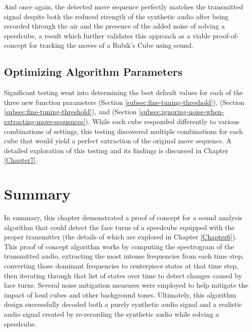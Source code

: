 And once again, the detected move sequence perfectly matches the transmitted signal despite both the reduced strength of the synthetic audio after being recorded through the air and the presence of the added noise of solving a speedcube, a result which further validates this approach as a viable proof-of-concept for tracking the moves of a Rubik's Cube using sound.

\subsection{Optimizing Algorithm Parameters}
\label{subsec:optimizing-params}
Significant testing went into determining the best default values for each of the three new function parameters  (Section \ref{subsec:fine-tuning-threshold}),  (Section \ref{subsec:fine-tuning-threshold}), and  (Section \ref{subsec:ignoring-noise-when-extracting-move-sequences}).
While each cube responded differently to various combinations of settings, this testing discovered multiple combinations for each cube that would yield a perfect extraction of the original move sequence.
A detailed exploration of this testing and its findings is discussed in Chapter \ref{Chapter7}.

\section{Summary}
In summary, this chapter demonstrated a proof of concept for a sound analysis algorithm that could detect the face turns of a speedcube equipped with the proper transmitter (the details of which are explored in Chapter \ref{Chapter6}).
This proof of concept algorithm works by computing the spectrogram of the transmitted audio, extracting the most intense frequencies from each time step, converting those dominant frequencies to centerpiece states at that time step, then iterating through that list of states over time to detect changes caused by face turns.
Several noise mitigation measures were employed to help mitigate the impact of loud cubes and other background tones.
Ultimately, this algorithm design successfully decoded both a purely synthetic audio signal and a realistic audio signal created by re-recording the synthetic audio while solving a speedcube.
